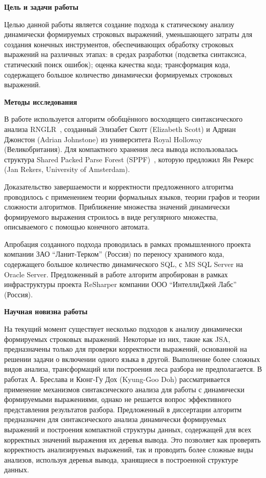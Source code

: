 \textbf{Цель и задачи работы}

Целью данной работы является создание подхода к статическому анализу динамически формируемых строковых выражений, уменьшающего затраты для создания конечных инструментов, обеспечивающих обработку строковых выражений на различных этапах: в средах разработки (подсветка синтаксиса, статический поиск ошибок); оценка качества кода; трансформация кода, содержащего большое количество динамически формируемых строковых выражений.

\textbf{Методы исследования}

В работе используется алгоритм обобщённого восходящего синтаксического анализа RNGLR~\cite{RNGLR}, созданный Элизабет Скотт (Elizabeth Scott) и Адриан Джонстон (Adrian Johnstone) из университета Royal Holloway (Великобритания). Для компактного хранения леса вывода использовалась структура Shared Packed Parse Forest (SPPF)~\cite{SPPF}, которую предложил Ян Рекерс (Jan Rekers, University of Amsterdam).

Доказательство завершаемости и корректности предложенного алгоритма проводилось с применением теории формальных языков, теории графов и теории сложности алгоритмов. Приближение множества значений динамически формируемого выражения строилось в виде регулярного множества, описываемого с помощью конечного автомата.

Апробация созданного подхода проводилась в рамках промышленного проекта компании ЗАО ``Ланит-Терком'' (Россия) по переносу хранимого кода, содержащего большое количество динамического SQL, с MS SQL Server на Oracle Server. Предложенный в работе алгоритм апробирован в рамках инфраструктуры проекта ReSharper компании ООО ``ИнтеллиДжей Лабс'' (Россия).

\textbf{Научная новизна работы}

На текущий момент существует несколько подходов к анализу динамически формируемых строковых выражений. Некоторые из них, такие как JSA, предназначены только для проверки корректности выражений, основанной на решении задачи о включении одного языка в другой. Выполнение более сложных видов анализа, трансформаций или построения леса разбора не предполагается. В работах А. Бреслава и Кюнг-Гу Дох (Kyung-Goo Doh) рассматривается применение механизмов синтаксического анализа для работы с динамически формируемыми выражениями, однако не решается вопрос эффективного представления результатов разбора. Предложенный в диссертации алгоритм предназначен для синтаксического анализа динамически формируемых выражений и построения компактной структуры данных, содержащей для всех корректных значений выражения их деревья вывода. Это позволяет как проверять корректность анализируемых выражений, так и проводить более сложные виды анализов, используя деревья вывода, хранящиеся в построенной структуре данных.

